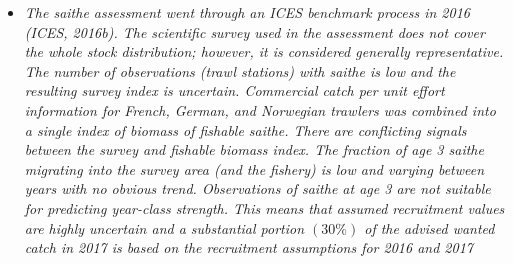 \documentclass[a4paper 12pt]{article}
\numberwithin{equation}{section}
\begin{document}
\begin{itemize}
\item \emph{The saithe assessment went through an ICES benchmark process in 2016 (ICES, 2016b). The scientific survey used in the assessment does not cover the whole stock distribution; however, it is considered generally representative. The number of observations (trawl stations) with saithe is low and the resulting survey index is uncertain. Commercial catch per unit effort information for French, German, and Norwegian trawlers was combined into a single index of biomass of fishable saithe. There are conflicting signals between the survey and fishable biomass index. The fraction of age 3 saithe migrating into the survey area (and the fishery) is low and varying between years with no obvious trend. Observations of saithe at age 3 are not suitable for predicting year-class strength. This means that assumed recruitment values are highly uncertain and a substantial portion $(30 \%)$ of the advised wanted catch in 2017 is based on the recruitment assumptions for 2016 and 2017 \citep{ICESJune2016}} 
\end{itemize}
\end{document}
